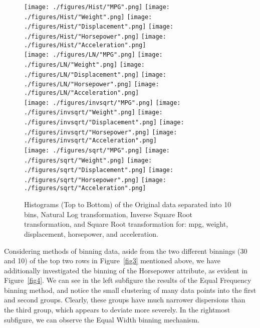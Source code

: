 \documentclass[10pt, conference, compsocconf]{IEEEtran}
\begin{document}
\begin{figure*}[!h]
	\vspace{-2mm}
	\centering
	\texttt{[image: ./figures/Hist/"MPG".png]}
	\texttt{[image: ./figures/Hist/"Weight".png]}
	\texttt{[image: ./figures/Hist/"Displacement".png]}
	\texttt{[image: ./figures/Hist/"Horsepower".png]}
	\texttt{[image: ./figures/Hist/"Acceleration".png]}\\
	
	\centering
	\texttt{[image: ./figures/LN/"MPG".png]}
	\texttt{[image: ./figures/LN/"Weight".png]}
	\texttt{[image: ./figures/LN/"Displacement".png]}
	\texttt{[image: ./figures/LN/"Horsepower".png]}
	\texttt{[image: ./figures/LN/"Acceleration".png]} \\
	
	\centering
	\texttt{[image: ./figures/invsqrt/"MPG".png]}
	\texttt{[image: ./figures/invsqrt/"Weight".png]}
	\texttt{[image: ./figures/invsqrt/"Displacement".png]}
	\texttt{[image: ./figures/invsqrt/"Horsepower".png]}
	\texttt{[image: ./figures/invsqrt/"Acceleration".png]}\\
	
	\centering
	\texttt{[image: ./figures/sqrt/"MPG".png]}
	\texttt{[image: ./figures/sqrt/"Weight".png]}
	\texttt{[image: ./figures/sqrt/"Displacement".png]}
	\texttt{[image: ./figures/sqrt/"Horsepower".png]}
	\texttt{[image: ./figures/sqrt/"Acceleration".png]}\\
	
	\caption{Histograms (Top to Bottom) of the Original data separated into 10 bins, Natural Log transformation, Inverse Square Root transformation, and Square Root transformation for: mpg, weight, displacement, horsepower, and acceleration.}
	\label{fig5}
\end{figure*}

Considering methods of binning data, aside from the two different binnings (30 and 10) of the top two rows in Figure~\ref{fig3} mentioned above, we have additionally investigated the binning of the Horsepower attribute, as evident in Figure~\ref{fig4}. We can see in the left subfigure the results of the Equal Frequency binning method, and notice the small clustering of many data points into the first and second groups. Clearly, these groups have much narrower dispersions than the third group, which appears to deviate more severely. In the rightmost subfigure, we can observe the Equal Width binning mechanism. 
\end{document}
